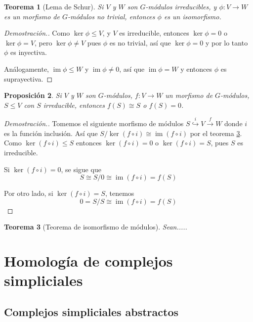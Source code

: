 \documentclass[12pt]{book}
\newtheorem{theorem}{Teorema}[section]
\newtheorem{proposition}[theorem]{Proposición}
\theoremstyle{definition}
\DeclareMathOperator{\im}{im}
\newcounter{in}
\begin{document}
\begin{theorem}[Lema de Schur]
  \label{lema-schur}
  Si $V$ y $W$ son $G$-módulos irreducibles, y $\phi:V\rightarrow W$
  es un morfismo de $G$-módulos no trivial, entonces $\phi$ es un isomorfismo.
\end{theorem}

\begin{proof}[Demostración.]
  Como $\ker \phi\leq V$, y $V$ es irreducible, entonces $\ker \phi=0$
  o $\ker\phi=V$, pero  $\ker\phi\neq V$ pues $\phi$ es no trivial,
  así que $\ker \phi=0$ y por lo tanto $\phi$ es inyectiva. 

  Análogamente, $\im\phi\leq W$ y $\im \phi\neq 0$, así que $\im
  \phi=W$ y entonces $\phi$ es suprayectiva.
\end{proof}

\begin{proposition}
  \label{im-mod-irreducible}
   Si $V$ y $W$ son $G$-módulos, $f:V\rightarrow W$ un morfismo de $G$-módulos, $S\leq V$ con $S$
  irreducible, entonces $f(S)\cong S$ o $f(S)=0$.
\end{proposition}

\begin{proof}[Demostración.]
  Tomemos el siguiente morfismo de módulos
  $S\stackrel{i}{\hookrightarrow} V\stackrel{f}{\rightarrow}W$ donde
  $i$ es la función inclusión. Así que $S/\ker(f\circ i)\cong\im(f\circ
  i)$ por el teorema \ref{teorema-isomorfismo-mod}. Como $\ker(f\circ
  i)\leq S$ entonces $\ker(f\circ i)=0$ o $\ker(f\circ i)=S$, pues $S$ es irreducible.

  Si $\ker(f\circ i)=0$, se sigue que
  $$S\cong S/0\cong\im(f\circ i)=f(S)$$

  Por otro lado, si $\ker(f\circ i)=S$, tenemos
  $$0=S/S\cong\im(f\circ i)=f(S)$$
\end{proof}
\bigskip
\begin{theorem}[Teorema de isomorfismo de módulos]
  \label{teorema-isomorfismo-mod}
  Sean.....
\end{theorem}
\chapter{Homología de complejos simpliciales}

\section{Complejos simpliciales abstractos}
\end{document}
